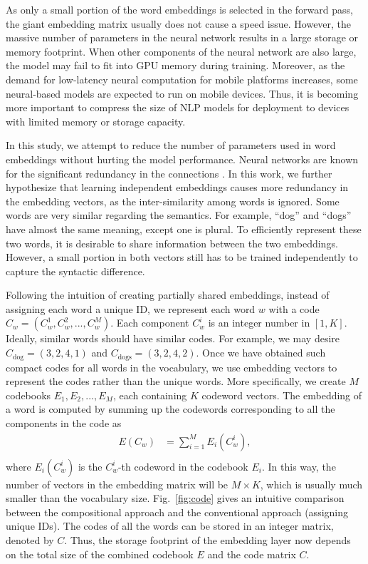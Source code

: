\documentclass{article} %
\begin{document}
As only a small portion of the word embeddings is selected in the forward pass, the giant embedding matrix usually does not cause a speed issue. However, the massive number of parameters in the neural network results in a large storage or memory footprint. When other components of the neural network are also large, the model may fail to fit into GPU memory during training.
Moreover, as the demand for low-latency neural computation for mobile platforms increases, some neural-based models are expected to run on mobile devices. Thus, it is becoming more important to compress the size of NLP models for deployment to devices with limited memory or storage capacity. 

In this study, we attempt to reduce the number of parameters used in word embeddings without hurting the model performance. Neural networks are known for the significant redundancy in the connections \citep{Denil2013PredictingPI}. In this work, we further hypothesize that learning independent embeddings causes more redundancy in the embedding vectors, as the inter-similarity among words is ignored. Some words are very similar regarding the semantics. For example, ``dog'' and ``dogs'' have almost the same meaning, except one is plural. To efficiently represent these two words, it is desirable to share information between the two embeddings. However, a small portion in both vectors still has to be trained independently to capture the syntactic difference.

Following the intuition of creating partially shared embeddings, instead of assigning each word a unique ID, we represent each word $w$ with a code $C_w = (C^1_w, C^2_w, ..., C^M_w)$. Each component $C_w^i$ is an integer number in $[1, K]$. Ideally, similar words should have similar codes. For example, we may desire $C_{\mbox{dog}} = (3, 2, 4, 1)$ and $C_{\mbox{dogs}} = (3, 2, 4, 2)$. Once we have obtained such compact codes for all words in the vocabulary, we use embedding vectors to represent the codes rather than the unique words. More specifically, we create $M$ codebooks $E_1, E_2, ..., E_M$, each containing $K$ codeword vectors. The embedding of a word is computed by summing up the codewords corresponding to all the components in the code as
\begin{align}
    E(C_w) &= \sum_{i=1}^M E_i(C_w^i), \label{eq:compose} \\
\end{align}
where $E_i(C^i_w)$ is the $C_w^i$-th codeword in the codebook $E_i$. In this way, the number of vectors in the embedding matrix will be $M \times K$, which is usually much smaller than the vocabulary size. Fig.~\ref{fig:code} gives an intuitive comparison between the compositional approach and the conventional approach (assigning unique IDs). The codes of all the words can be stored in an integer matrix, denoted by $C$. Thus, the storage footprint of the embedding layer now depends on the total size of the combined codebook $E$ and the code matrix $C$.
\end{document}
